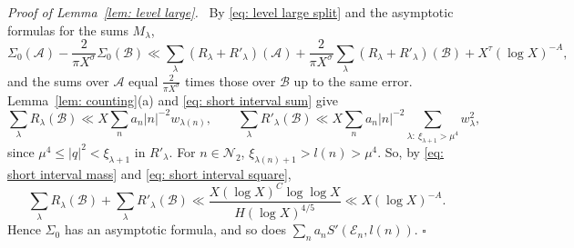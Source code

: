 \documentclass{article}
\numberwithin{equation}{section}
\newenvironment{proof}[1][Proof]{\par\medskip\noindent\textit{#1.}\ }{\hfill$\square$\par\medskip}
\newcommand{\Le}{\leqslant}
\begin{document}
\begin{proof}[Proof of Lemma~\ref{lem: level large}]
By \eqref{eq: level large split} and the asymptotic formulas for the sums $M_\lambda$,
\begin{equation*}
\Sigma_0(\mathcal{A}) - \frac{2}{\pi X^{\sigma}} \Sigma_0(\mathcal{B}) \ll \sum_\lambda (R_\lambda + R'_\lambda)(\mathcal{A}) + \frac{2}{\pi X^{\sigma}} \sum_\lambda (R_\lambda + R'_\lambda)(\mathcal{B}) + X^{\tau}(\log X)^{-A},
\end{equation*}
and the sums over $\mathcal{A}$ equal $\frac{2}{\pi X^{\sigma}}$ times those over $\mathcal{B}$ up to the same error. Lemma~\ref{lem: counting}(a) and \eqref{eq: short interval sum} give
\begin{equation*}
\sum_\lambda R_\lambda(\mathcal{B}) \ll X \sum_n a_n |n|^{-2} w_{\lambda(n)}, \qquad \sum_\lambda R'_\lambda(\mathcal{B}) \ll X \sum_n a_n |n|^{-2} \sum_{\lambda:\ \xi_{\lambda + 1} > \mu^4} w_\lambda^2,
\end{equation*}
since $\mu^4 \Le |q|^2 < \xi_{\lambda + 1}$ in $R'_\lambda$. For $n \in \mathcal{N}_2$, $\xi_{\lambda(n) + 1} > l(n) > \mu^4$. So, by \eqref{eq: short interval mass} and \eqref{eq: short interval square},
\begin{equation*}
\sum_\lambda R_\lambda(\mathcal{B}) + \sum_\lambda R'_\lambda(\mathcal{B}) \ll \frac{X (\log X)^C \log\log X}{H (\log X)^{4/5}} \ll X (\log X)^{-A}.
\end{equation*} Hence $\Sigma_0$ has an asymptotic formula, and so does $\sum_n a_n S'(\mathcal{E}_n, l(n))$.
\end{proof}
\end{document}
